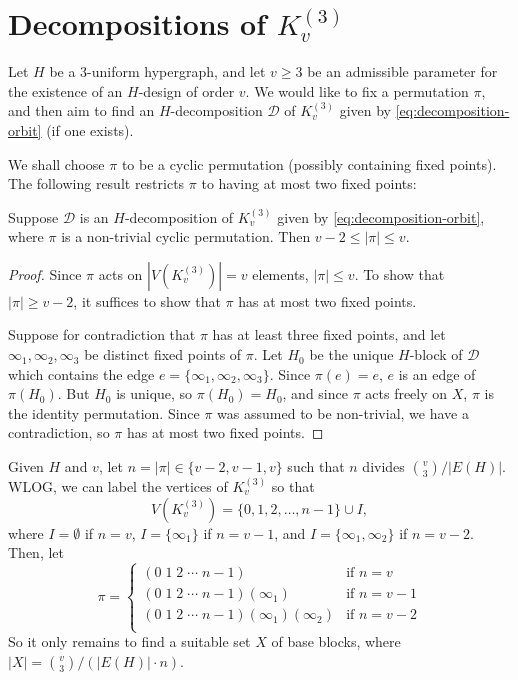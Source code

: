 \section{Decompositions of $K_{v}^{(3)}$}

Let $H$ be a $3$-uniform hypergraph, and let $v \geq 3$ be an admissible parameter for the existence of an $H$-design of order $v$.
We would like to fix a permutation $\pi$, and then aim to find an $H$-decomposition $\mathcal{D}$ of $K_{v}^{(3)}$ given by \eqref{eq:decomposition-orbit} (if one exists).

We shall choose $\pi$ to be a cyclic permutation (possibly containing fixed points). The following result restricts $\pi$ to having at most two fixed points:

\begin{lemma}
Suppose $\mathcal{D}$ is an $H$-decomposition of $K_{v}^{(3)}$ given by \eqref{eq:decomposition-orbit}, where $\pi$ is a non-trivial cyclic permutation. Then $v-2 \leq |\pi| \leq v$.
\end{lemma}

\begin{proof}
Since $\pi$ acts on $|V(K_{v}^{(3)})| = v$ elements, $|\pi| \leq v$.
To show that $|\pi| \geq v-2$, it suffices to show that $\pi$ has at most two fixed points.

Suppose for contradiction that $\pi$ has at least three fixed points, and let $\infty_1, \infty_2, \infty_3$ be distinct fixed points of $\pi$. Let $H_0$ be the unique $H$-block of $\mathcal{D}$ which contains the edge $e = \{\infty_1, \infty_2, \infty_3\}$.
Since $\pi(e) = e$, $e$ is an edge of $\pi(H_0)$. But $H_0$ is unique, so $\pi(H_0) = H_0$, and since $\pi$ acts freely on $X$, $\pi$ is the identity permutation.
Since $\pi$ was assumed to be non-trivial, we have a contradiction, so $\pi$ has at most two fixed points.
\end{proof}

Given $H$ and $v$, let $n = |\pi| \in \{v-2, v-1, v\}$ such that $n$ divides ${v \choose 3}/|E(H)|$. WLOG, we can label the vertices of $K_{v}^{(3)}$ so that
\begin{equation} \label{eq:complete-vertices}
    V(K_{v}^{(3)}) = \{0, 1, 2, \ldots, n-1\} \cup I,
\end{equation}
where $I = \emptyset$ if $n = v$, $I = \{\infty_1\}$ if $n = v-1$, and $I = \{\infty_1, \infty_2\}$ if $n = v-2$. Then, let
\begin{equation} \label{eq:complete-permutation}
    \pi =
    \begin{cases}
        (0\; 1\; 2\; \cdots\; n-1) & \text{if } n = v \\
        (0\; 1\; 2\; \cdots\; n-1) (\infty_1) & \text{if } n = v-1 \\
        (0\; 1\; 2\; \cdots\; n-1) (\infty_1) (\infty_2) & \text{if } n = v-2 \\
    \end{cases}
\end{equation}
So it only remains to find a suitable set $X$ of base blocks, where $|X| = {v \choose 3}/(|E(H)| \cdot n)$.

